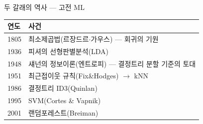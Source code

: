 \begin{frame}{두 갈래의 역사 --- 고전 ML}
  \small
  \\[0.4em]
  \begin{tabular}{@{}ll@{}}
    \toprule
    연도 & 사건 \\
    \midrule
    1805 & 최소제곱법(르장드르$\cdot$가우스) --- 회귀의 기원 \\
    1936 & 피셔의 선형판별분석(LDA) \\
    1948 & 섀넌의 정보이론(엔트로피) --- 결정트리 분할 기준의 토대 \\
    1951 & 최근접이웃 규칙(Fix\&Hodges) $\to$ kNN \\
    1986 & 결정트리 ID3(Quinlan) \\
    1995 & SVM(Cortes \& Vapnik) \\
    2001 & 랜덤포레스트(Breiman) \\
    \bottomrule
  \end{tabular}
\end{frame}
